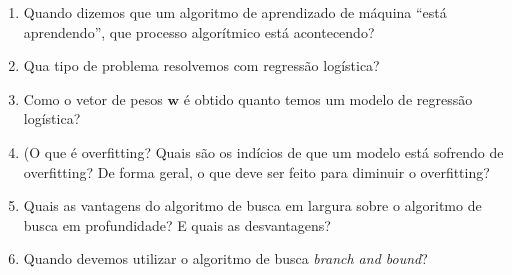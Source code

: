 \documentclass{article}
\begin{document}
\begin{enumerate}
\item Quando dizemos que um algoritmo de aprendizado de máquina ``está aprendendo'', que processo algorítmico está acontecendo?

\item Qua tipo de problema resolvemos com regressão logística?

\item Como o vetor de pesos $\mathbf{w}$ é obtido quanto temos um modelo de regressão logística? 

\item (O que é overfitting? Quais são os indícios de que um modelo está sofrendo de overfitting? De forma geral, o que deve ser feito para diminuir o overfitting?

\item Quais as vantagens do algoritmo de busca em largura sobre o algoritmo de busca em profundidade? E quais as desvantagens?

\item Quando devemos utilizar o algoritmo de busca \textit{branch and bound}?

\end{enumerate}
\end{document}
